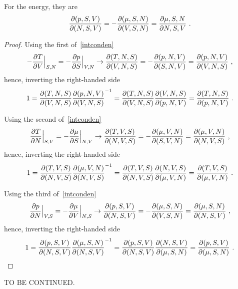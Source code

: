     For the energy, they are
    \begin{equation*}
        \frac{\partial(p, S, V )}{\partial(N, S, V)} = - \frac{\partial(\mu, S, N)}{\partial(V, S, N)} = \frac{\partial\mu, S, N}{\partial N, S, V} ~.
    \end{equation*}
    \begin{proof}
        Using the first of~\eqref{intconden}
        \begin{equation*}
            - \frac{\partial T}{\partial V} \Big \vert_{S, N} = - \frac{\partial p}{\partial S} \Big \vert_{V, N} \rightarrow \frac{\partial(T, N, S)}{\partial(V, N, S)} = - \frac{\partial(p, N, V)}{\partial(S, N, V)} = \frac{\partial(p, N, V)}{\partial(V, N, S)} ~,
        \end{equation*} 
        hence, inverting the right-handed side
        \begin{equation*}
            1 = \frac{\partial(T, N, S)}{\partial(V, N, S)} \frac{\partial(p, N, V)}{\partial(V, N, S)}^{-1} = \frac{\partial(T, N, S)}{\partial(V, N, S)} \frac{\partial(V, N, S)}{\partial(p, N, V)} = \frac{\partial(T, N, S)}{\partial(p, N, V)} ~.
        \end{equation*} 

        Using the second of~\eqref{intconden}
        \begin{equation*}
            \frac{\partial T}{\partial N} \Big \vert_{S, V} = - \frac{\partial\mu}{\partial S} \Big \vert_{N, V} \rightarrow \frac{\partial(T, V, S)}{\partial(N, V, S)} = - \frac{\partial(\mu, V, N)}{\partial(S, V, N)} = \frac{\partial(\mu, V, N)}{\partial(N, V, S)} ~,
        \end{equation*} 
        hence, inverting the right-handed side
        \begin{equation*}
            1 = \frac{\partial(T, V, S)}{\partial(N, V, S)} \frac{\partial(\mu, V, N)}{\partial(N, V, S)}^{-1} = \frac{\partial(T, V, S)}{\partial(N, V, S)} \frac{\partial(N, V, S)}{\partial(\mu, V, N)} = \frac{\partial(T, V, S)}{\partial(\mu, V, N)} ~.
        \end{equation*} 

        Using the third of~\eqref{intconden}
        \begin{equation*}
            \frac{\partial p}{\partial N} \Big \vert_{V, S} = - \frac{\partial\mu}{\partial V} \Big \vert_{N, S} \rightarrow \frac{\partial(p, S, V )}{\partial(N, S, V)} = - \frac{\partial(\mu, S, N)}{\partial(V, S, N)} = \frac{\partial(\mu, S, N)}{\partial(N, S, V)} ~,
        \end{equation*} 
        hence, inverting the right-handed side
        \begin{equation*}
            1 = \frac{\partial(p, S, V )}{\partial(N, S, V)} \frac{\partial(\mu, S, N)}{\partial(N, S, V)}^{-1} = \frac{\partial(p, S, V )}{\partial(N, S, V)} \frac{\partial(N, S, V)}{\partial(\mu, S, N)} = \frac{\partial(p, S, V )}{\partial(\mu, S, N)} ~.
        \end{equation*} 
    \end{proof}

    TO BE CONTINUED.


